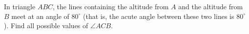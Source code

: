 In triangle $ABC$, the lines containing the altitude from $A$ and the altitude from $B$ meet at an angle of $80^\circ$ (that is, the acute angle between these two lines is $80^\circ$). Find all possible values of $\angle ACB$.
